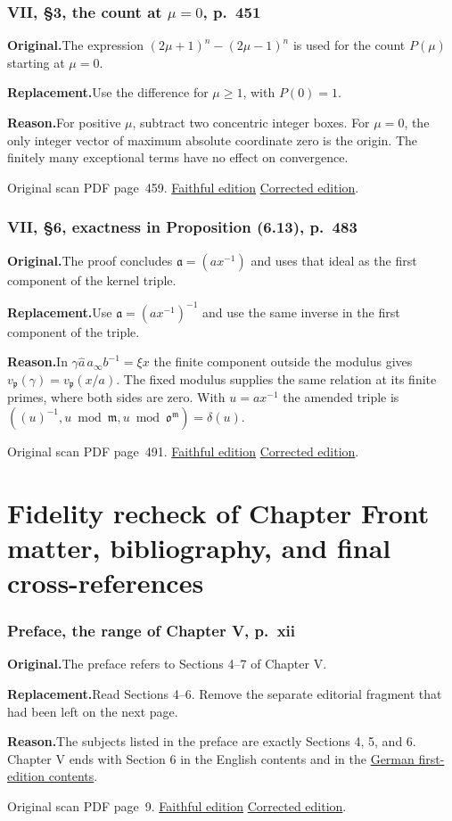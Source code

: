 \documentclass[11pt,a4paper]{article}
\newcommand{\original}{\par\smallskip\noindent\textbf{Original.}\enspace}
\newcommand{\replacement}{\par\smallskip\noindent\textbf{Replacement.}\enspace}
\newcommand{\reason}{\par\smallskip\noindent\textbf{Reason.}\enspace}
\newcommand{\editionlink}[3]{\href{#1\#errata.#2}{#3}}
\newcommand{\location}[2]{%
  \par\smallskip\noindent Original scan PDF page~#2.\enspace
  \editionlink{Neukirch_Faithful.pdf}{#1}{Faithful edition}
  \quad\editionlink{Neukirch_Corrected.pdf}{#1}{Corrected edition}.}
\begin{document}
\section{VII, \S3, the count at $\mu=0$, p.~451}\label{errata:item:210}

\original The expression $(2\mu+1)^n-(2\mu-1)^n$ is used for the count $P(\mu)$ starting at $\mu=0$.
\replacement Use the difference for $\mu\ge1$, with $P(0)=1$.
\reason For positive $\mu$, subtract two concentric integer boxes. For $\mu=0$, the only integer vector of maximum absolute coordinate zero is the origin. The finitely many exceptional terms have no effect on convergence.
\location{210}{459}

\setcounter{section}{210}
\section{VII, \S6, exactness in Proposition (6.13), p.~483}\label{errata:item:211}

\original The proof concludes $\mathfrak a=(ax^{-1})$ and uses that ideal as the first component of the kernel triple.
\replacement Use $\mathfrak a=(ax^{-1})^{-1}$ and use the same inverse in the first component of the triple.
\reason In $\gamma\widehat a\,a_\infty b^{-1}=\xi x$ the finite component outside the modulus gives $v_{\mathfrak p}(\gamma)=v_{\mathfrak p}(x/a)$. The fixed modulus supplies the same relation at its finite primes, where both sides are zero. With $u=ax^{-1}$ the amended triple is $((u)^{-1}, u\bmod\mathfrak m,u\bmod\mathfrak o^{\mathfrak m})=\delta(u)$.
\location{211}{491}

\part{Fidelity recheck of Chapter Front matter, bibliography, and final cross-references}
\setcounter{section}{211}
\section{Preface, the range of Chapter V, p.~xii}\label{errata:item:212}

\original The preface refers to Sections 4--7 of Chapter V.
\replacement Read Sections 4--6. Remove the separate editorial fragment that had been left on the next page.
\reason The subjects listed in the preface are exactly Sections 4, 5, and 6. Chapter V ends with Section 6 in the English contents and in the \href{https://d-nb.info/911137882/04}{German first-edition contents}.
\location{212}{9}
\end{document}
